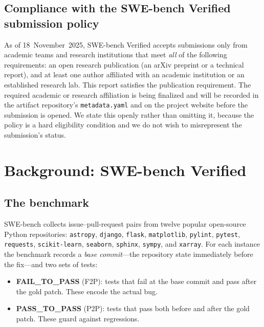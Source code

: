 \documentclass[11pt,a4paper]{article}
\begin{document}
\subsection{Compliance with the SWE-bench Verified submission policy}

As of 18~November~2025, SWE-bench Verified accepts submissions only from academic teams
and research institutions that meet \emph{all} of the following requirements: an open
research publication (an arXiv preprint or a technical report), and at least one author
affiliated with an academic institution or an established research lab. This report
satisfies the publication requirement. The required academic or research affiliation is
being finalized and will be recorded in the artifact repository's \texttt{metadata.yaml}
and on the project website before the submission is opened. We state this openly rather
than omitting it, because the policy is a hard eligibility condition and we do not wish
to misrepresent the submission's status.

\section{Background: SWE-bench Verified}

\subsection{The benchmark}

SWE-bench \cite{jimenez2024swebench} collects issue--pull-request pairs from twelve
popular open-source Python repositories: \texttt{astropy}, \texttt{django},
\texttt{flask}, \texttt{matplotlib}, \texttt{pylint}, \texttt{pytest}, \texttt{requests},
\texttt{scikit-learn}, \texttt{seaborn}, \texttt{sphinx}, \texttt{sympy}, and
\texttt{xarray}. For each instance the benchmark records a \emph{base commit}---the
repository state immediately before the fix---and two sets of tests:

\begin{itemize}[leftmargin=1.4em]
  \item \textbf{FAIL\_TO\_PASS} (F2P): tests that fail at the base commit and pass after
  the gold patch. These encode the actual bug.
  \item \textbf{PASS\_TO\_PASS} (P2P): tests that pass both before and after the gold
  patch. These guard against regressions.
\end{itemize}
\end{document}
